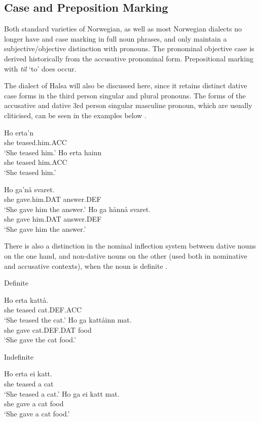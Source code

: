 \subsection{Case and Preposition Marking}
Both standard varieties of Norwegian, as well as most Norwegian dialects no longer have and case marking in full noun phrases, and only maintain a subjective/objective distinction with pronouns. The pronominal objective case is derived historically from the accusative pronominal form. Prepositional marking with \emph{til} `to' does occur. 

The dialect of Halsa will also be discussed here, since it retains distinct dative case forms in the third person singular and plural pronouns. The forms of the accusative and dative 3rd person singular masculine pronoun, which are usually cliticised, can be seen in the examples below \citep{Afarli.2012}.
\begin{exe}
\ex
\begin{xlist}
\ex \gll Ho erta'n\\
she teased.him.ACC\\
\trans `She teased him.'
\ex \gll Ho erta hainn\\
she teased him.ACC\\
\trans `She teased him.'
\end{xlist}
\ex
\begin{xlist}
\ex \gll Ho ga'nå svaret.\\
she gave.him.DAT answer.DEF\\
\trans `She gave him the answer.'
\ex \gll Ho ga hånnå svaret.\\
she gave him.DAT answer.DEF\\
\trans `She gave him the answer.'
\end{xlist}
\end{exe}
There is also a distinction in the nominal inflection system between dative nouns on the one hand, and non-dative nouns on the other (used both in nominative and accusative contexts), when the noun is definite \citep{Afarli.2012}.
\begin{exe}
\ex Definite
\begin{xlist}
\ex \gll Ho erta kattå.\\
she teased cat.DEF.ACC\\
\trans `She teased the cat.'
\ex \gll Ho ga kattåinn mat.\\
she gave cat.DEF.DAT food\\
\trans `She gave the cat food.'
\end{xlist}
\ex Indefinite
\begin{xlist}
\ex \gll Ho erta ei katt.\\
she teased a cat\\
\trans `She teased a cat.'
\ex \gll Ho ga ei katt mat.\\
she gave a cat food\\
\trans `She gave a cat food.'
\end{xlist}
\end{exe}
